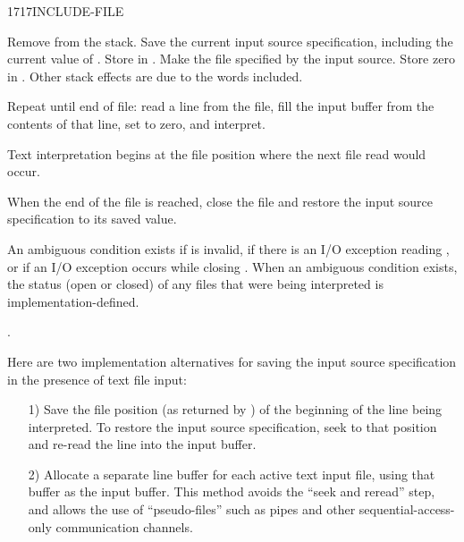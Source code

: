 \begin{worddef}{1717}{INCLUDE-FILE}
\item {}

	Remove  from the stack. Save the current input
	source specification, including the current value of
	. Store  in .
	Make the file specified by  the input source. Store
	zero in . Other stack effects are due to the
	words included.

	Repeat until end of file: read a line from the file, fill the
	input buffer from the contents of that line, set 
	to zero, and interpret.

	Text interpretation begins at the file position where the next
	file read would occur.

	When the end of the file is reached, close the file and restore
	the input source specification to its saved value.

	An ambiguous condition exists if  is invalid, if
	there is an I/O exception reading , or if an I/O
	exception occurs while closing . When an ambiguous
	condition exists, the status (open or closed) of any files that
	were being interpreted is implementation-defined.

\see {}.

	\begin{defer}
	\rationale %
		Here are two implementation alternatives for saving the input
		source specification in the presence of text file input:

		\begin{enumerate}
		\item[1)] Save the file position (as returned by
			) of the beginning of the line being
			interpreted. To restore the input source specification,
			seek to that position and re-read the line into the input
			buffer.

		\item[2)] Allocate a separate line buffer for each active text
			input file, using that buffer as the input buffer. This
			method avoids the ``seek and reread'' step, and allows the
			use of ``pseudo-files'' such as pipes and other
			sequential-access-only communication channels.
		\end{enumerate}
	\end{defer}
\end{worddef}


